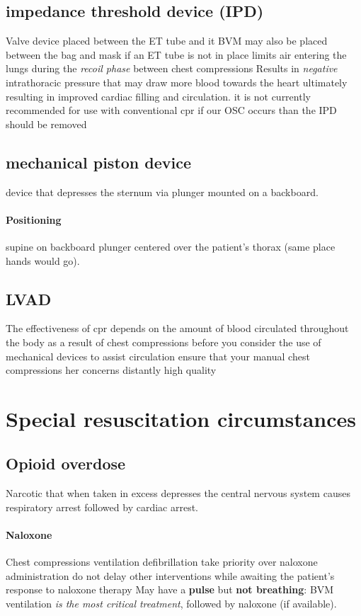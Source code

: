 \documentclass[../../EMT-169.tex]{subfiles}
\begin{document}
\subsection{impedance threshold device (IPD)}
Valve device placed between the ET tube and it BVM
may also be placed between the bag and mask if an ET tube is not in place
limits air entering the lungs during the \emph{recoil phase} between chest compressions
Results in \emph{negative} intrathoracic pressure that may draw more blood towards the heart ultimately resulting in improved cardiac filling and circulation.
it is not currently recommended for use with conventional \acrshort{cpr}
if our OSC occurs than the IPD should be removed
\subsection{mechanical piston device} device that depresses the sternum via plunger mounted on a backboard.
\paragraph{Positioning} supine on backboard \newline plunger centered over the patient's thorax (same place hands would go).

\subsection{LVAD}
The effectiveness of \acrshort{cpr} depends on the amount of blood circulated throughout the body as a result of chest compressions
before you consider the use of mechanical devices to assist circulation ensure that your manual chest compressions her concerns distantly high quality

\section{Special resuscitation circumstances} 
\subsection{Opioid overdose}
Narcotic that when taken in excess depresses the central nervous system causes respiratory arrest followed by cardiac arrest.
\paragraph{Naloxone} Chest compressions ventilation defibrillation take priority over naloxone 
administration do not delay other interventions while awaiting the patient's response to naloxone therapy 
May have a \textbf{pulse} but \textbf{not breathing}: BVM ventilation \emph{is the most critical treatment}, followed by naloxone (if available). \newline
\end{document}
